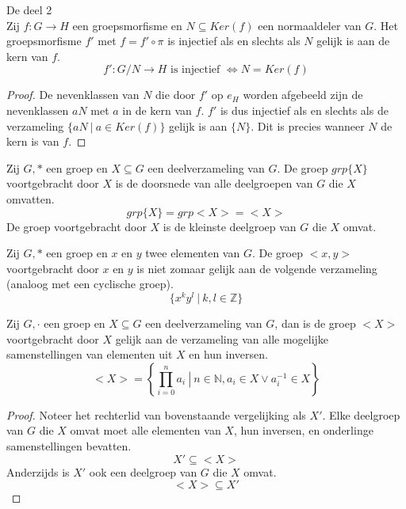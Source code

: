 \documentclass[main.tex]{subfiles}
\begin{document}
\begin{st}
  De  deel 2\\
  Zij $f: G\rightarrow H$ een groepsmorfisme en $N\subseteq Ker(f)$ een normaaldeler van $G$.
  Het groepsmorfisme $f'$ met $f = f'\circ \pi$ is injectief als en slechts als $N$ gelijk is aan de kern van $f$.
  \[ f':G/N \rightarrow H \text{ is injectief } \Leftrightarrow N = Ker(f) \]

  \begin{proof}
    De nevenklassen van $N$ die door $f'$ op $e_{H}$ worden afgebeeld zijn de nevenklassen $aN$ met $a$ in de kern van $f$.
    $f'$ is dus injectief als en slechts als de verzameling $\{ aN \ |\ a \in Ker(f) \}$ gelijk is aan $\{ N \}$.
    Dit is precies wanneer $N$ de kern is van $f$.
  \end{proof}
\end{st}

\begin{de}
  Zij $G,*$ een groep en $X \subseteq G$ een deelverzameling van $G$.
  De groep $grp\{X\}$ voortgebracht door $X$ is de doorsnede van alle deelgroepen van $G$ die $X$ omvatten. 
  \[ grp\{X\} = grp<X> = <X> \]
  De groep voortgebracht door $X$ is de kleinste deelgroep van $G$ die $X$ omvat.
\end{de}

\begin{opm}
  Zij $G,*$ een groep en $x$ en $y$ twee elementen van $G$.
  De groep $<x,y>$ voortgebracht door $x$ en $y$ is niet zomaar gelijk aan de volgende verzameling (analoog met een cyclische groep).
  \[ \{ x^{k}y^{l}\ |\ k,l\in \mathbb{Z} \} \]
\end{opm}

\begin{ei}
  Zij $G,\cdot$ een groep en $X \subseteq G$ een deelverzameling van $G$, dan is de groep $<X>$ voortgebracht door $X$ gelijk aan de verzameling van alle mogelijke samenstellingen van elementen uit $X$ en hun inversen.
  \[ <X> = \left\{ \prod_{i=0}^{n}a_{i} \ \left|\ n\in \mathbb{N}, a_{i}\in X \vee a_{i}^{-1} \in X \right.\right\}\]

  \begin{proof}
    Noteer het rechterlid van bovenstaande vergelijking als $X'$.
    Elke deelgroep van $G$ die $X$ omvat moet alle elementen van $X$, hun inversen, en onderlinge samenstellingen bevatten.
    \[ X' \subseteq <X> \]
    Anderzijds is $X'$ ook een deelgroep van $G$ die $X$ omvat.
\waarom
    \[ <X> \subseteq X' \]
  \end{proof}
\end{ei}
\end{document}
